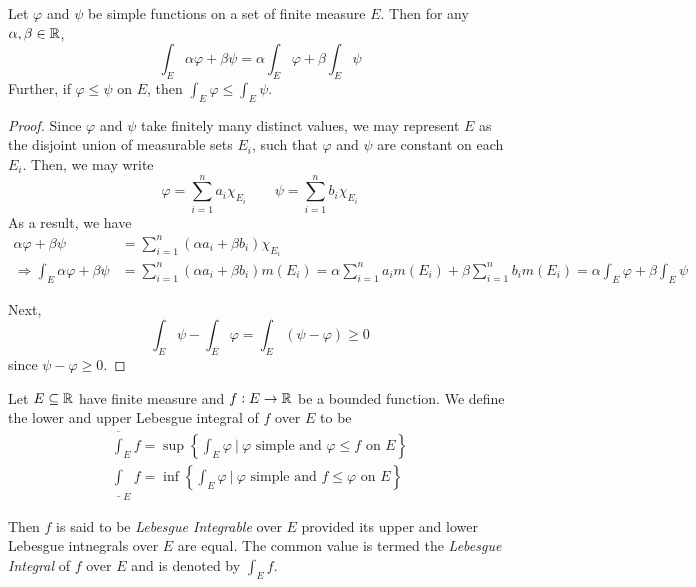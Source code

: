 \begin{proposition}
    Let $\varphi$ and $\psi$ be simple functions on a set of finite measure $E$. Then for any $\alpha,\beta\in\mathbb{R}$, 
    \begin{equation*}
        \int_E \alpha\varphi + \beta\psi = \alpha\int_E\varphi + \beta\int_E\psi
    \end{equation*}
    Further, if $\varphi\le\psi$ on $E$, then $\int_E\varphi\le\int_E\psi$.
\end{proposition}
\begin{proof}
    Since $\varphi$ and $\psi$ take finitely many distinct values, we may represent $E$ as the disjoint union of measurable sets $E_i$, such that $\varphi$ and $\psi$ are constant on each $E_i$. Then, we may write 
    \begin{equation*}
        \varphi = \sum_{i = 1}^n a_i\chi_{E_i}\qquad\psi = \sum_{i = 1}^n b_i\chi_{E_i}
    \end{equation*}
    As a result, we have 
    \begin{align*}
        \alpha\varphi + \beta\psi &= \sum_{i = 1}^n (\alpha a_i + \beta b_i)\chi_{E_i}\\
        \Longrightarrow\int_{E}\alpha\varphi + \beta\psi &= \sum_{i = 1}^n(\alpha a_i + \beta b_i)m(E_i) = \alpha\sum_{i = 1}^n a_i m(E_i) + \beta\sum_{i = 1}^n b_i m(E_i) = \alpha\int_E\varphi + \beta\int_E\psi
    \end{align*}

    Next,
    \begin{equation*}
        \int_E\psi - \int_E\varphi = \int_E(\psi - \varphi) \ge 0
    \end{equation*}
    since $\psi -\varphi\ge 0$.
\end{proof}

\begin{definition}
    Let $E\subseteq\mathbb{R}$ have finite measure and $f: E\to\mathbb{R}$ be a bounded function. We define the lower and upper Lebesgue integral of $f$ over $E$ to be 
    \begin{align*}
        \overline{\int}_E f = \sup\left\{\int_E\varphi~\bigg\vert~\varphi\text{ simple and $\varphi\le f$ on $E$}\right\}\\
        \underline{\int}_E f = \inf\left\{\int_E\varphi~\bigg\vert~\varphi\text{ simple and $f\le \varphi$ on $E$}\right\}
    \end{align*}

    Then $f$ is said to be \textit{Lebesgue Integrable} over $E$ provided its upper and lower Lebesgue intnegrals over $E$ are equal. The common value is termed the \textit{Lebesgue Integral} of $f$ over $E$ and is denoted by $\int_E f$.
\end{definition}

